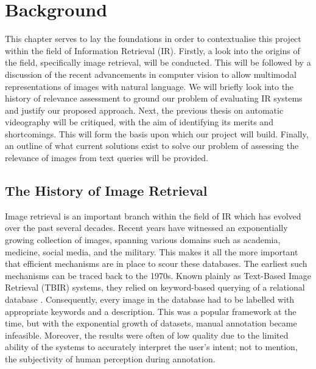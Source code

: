 \documentclass{l4proj}
\begin{document}
\chapter{Background}
This chapter serves to lay the foundations in order to contextualise this project within the field of Information Retrieval (IR). Firstly, a look into the origins of the field, specifically image retrieval, will be conducted. This will be followed by a discussion of the recent advancements in computer vision to allow multimodal representations of images with natural language. We will briefly look into the history of relevance assessment to ground our problem of evaluating IR systems and justify our proposed approach. Next, the previous thesis on automatic videography will be critiqued, with the aim of identifying its merits and shortcomings. This will form the basis upon which our project will build. Finally, an outline of what current solutions exist to solve our problem of assessing the relevance of images from text queries will be provided.

\section{The History of Image Retrieval}
Image retrieval is an important branch within the field of IR which has evolved over the past several decades. Recent years have witnessed an exponentially growing collection of images, spanning various domains such as academia, medicine, social media, and the military. This makes it all the more important that efficient mechanisms are in place to scour these databases. The earliest such mechanisms can be traced back to the 1970s. Known plainly as Text-Based Image Retrieval (TBIR) systems, they relied on keyword-based querying of a relational database \citep{chang1979tbir}. Consequently, every image in the database had to be labelled with appropriate keywords and a description. This was a popular framework at the time, but with the exponential growth of datasets, manual annotation became infeasible. Moreover, the results were often of low quality due to the limited ability of the systems to accurately interpret the user's intent; not to mention, the subjectivity of human perception during annotation.
\end{document}
